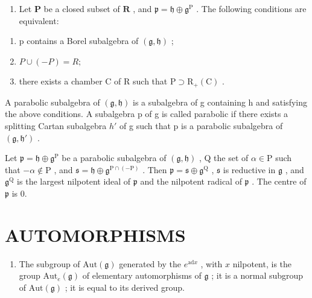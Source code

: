 \begin{enumerate}
\def\labelenumi{\arabic{enumi})}
\setcounter{enumi}{14}
\tightlist
\item
  Let \(\mathbf{P}\) be a closed subset of \(\mathbf{R}\) , and \(\mathfrak{p} = \mathfrak{h} \oplus \mathfrak{g}^{\mathrm{P}}\) . The following conditions are equivalent:
\end{enumerate}

\begin{enumerate}
\def\labelenumi{(\roman{enumi})}
\item
  p contains a Borel subalgebra of \((\mathfrak{g}, \mathfrak{h})\) ;
\item
  \(P \cup (-P) = R;\)
\item
  there exists a chamber C of R such that \(\mathrm{P} \supset \mathrm{R}_{+}(\mathrm{C})\) .
\end{enumerate}

A parabolic subalgebra of \((\mathfrak{g},\mathfrak{h})\) is a subalgebra of g containing h and satisfying the above conditions. A subalgebra p of g is called parabolic if there exists a splitting Cartan subalgebra \(h'\) of g such that p is a parabolic subalgebra of \((\mathfrak{g},\mathfrak{h}')\) .

Let \(\mathfrak{p} = \mathfrak{h} \oplus \mathfrak{g}^{\mathrm{P}}\) be a parabolic subalgebra of \((\mathfrak{g}, \mathfrak{h})\) , Q the set of \(\alpha \in \mathrm{P}\) such that \(-\alpha \notin \mathrm{P}\) , and \(\mathfrak{s} = \mathfrak{h} \oplus \mathfrak{g}^{\mathrm{P} \cap (-\mathrm{P})}\) . Then \(\mathfrak{p} = \mathfrak{s} \oplus \mathfrak{g}^{\mathrm{Q}}\) , \(\mathfrak{s}\) is reductive in \(\mathfrak{g}\) , and \(\mathfrak{g}^{\mathrm{Q}}\) is the largest nilpotent ideal of \(\mathfrak{p}\) and the nilpotent radical of \(\mathfrak{p}\) . The centre of \(\mathfrak{p}\) is 0.

\section*{AUTOMORPHISMS}

\begin{enumerate}
\def\labelenumi{\arabic{enumi})}
\setcounter{enumi}{15}
\tightlist
\item
  The subgroup of \(\mathrm{Aut}(\mathfrak{g})\) generated by the \(e^{\mathrm{ad}x}\) , with \(x\) nilpotent, is the group \(\mathrm{Aut}_e(\mathfrak{g})\) of elementary automorphisms of \(\mathfrak{g}\) ; it is a normal subgroup of \(\mathrm{Aut}(\mathfrak{g})\) ; it is equal to its derived group.
\end{enumerate}


